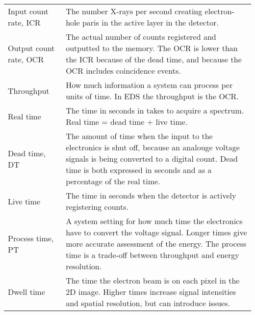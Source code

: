 \begin{table}[pht]
\begin{center}
\begin{tabular}{p{2.6cm}p{12cm}}
            Input count rate, ICR             & The number X-rays per second creating electron-hole paris in the active layer in the detector.                                                                                                                             \\
            Output count rate, OCR            & The actual number of counts registered and outputted to the memory. The OCR is lower than the ICR because of the dead time, and because the OCR includes coincidence events.                                               \\
            Throughput                        & How much information a system can process per units of time. In EDS the throughput is the OCR.                                                                                                                             \\
            Real time                         & The time in seconds in takes to acquire a spectrum. Real time = dead time + live time.                                                                                                                                     \\
            Dead time, DT                     & The amount of time when the input to the electronics is shut off, because an analouge voltage signals is being converted to a digital count. Dead time is both expressed in seconds and as a percentage of the real time.  \\
            Live time                         & The time in seconds when the detector is actively registering counts.                                                                                                                                                      \\
            Process time, PT                  & A system setting for how much time the electronics have to convert the voltage signal. Longer times give more accurate assessment of the energy. The process time is a trade-off between throughput and energy resolution. \\
            Dwell time                        & The time the electron beam is on each pixel in the 2D image. Higher times increase signal intensities and spatial resolution, but can introduce issues.                                                                    \\
            \hline
        \end{tabular}
    \end{center}
\end{table}